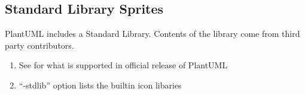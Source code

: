 \documentclass[letterpaper,10pt,english]{sphinxmanual}
\begin{document}
\subsection{Standard Library Sprites}
\label{\detokenize{PlantUMLSpriteLibraries/plantuml_sprites:standard-library-sprites}}
PlantUML includes a Standard Library. Contents of the library come from third party contributors.
\begin{enumerate}
%
\item {} 
See  for what is supported in official release of PlantUML

\item {} 
“-stdlib” option lists the builtin icon libaries

\end{enumerate}
\end{document}

